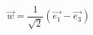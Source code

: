 \begin{displaymath}
 \overrightarrow{w}=\frac{1}{\sqrt{2}}(\overrightarrow{e_1}-\overrightarrow{e_3})
\end{displaymath}
